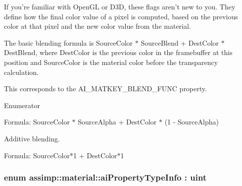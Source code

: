 If you're familiar with Open\+G\+L or D3\+D, these flags aren't new to you. They define how the final color value of a pixel is computed, based on the previous color at that pixel and the new color value from the material.

The basic blending formula is {\ttfamily Source\+Color $\ast$ Source\+Blend + Dest\+Color $\ast$ Dest\+Blend}, where {\ttfamily Dest\+Color} is the previous color in the framebuffer at this position and {\ttfamily Source\+Color} is the material color before the transparency calculation.

This corresponds to the {\ttfamily A\+I\+\_\+\+M\+A\+T\+K\+E\+Y\+\_\+\+B\+L\+E\+N\+D\+\_\+\+F\+U\+N\+C} property. \begin{Desc}
\item[Enumerator]\par
\begin{description}
\item[{\em 
\hypertarget{namespaceassimp_1_1material_a9f8c96d3f766b60d6a002a839366b1eba3f08be388721c4fd720fb6338e6fb1dd}{Default}\label{namespaceassimp_1_1material_a9f8c96d3f766b60d6a002a839366b1eba3f08be388721c4fd720fb6338e6fb1dd}
}]Formula\+: {\ttfamily Source\+Color $\ast$ Source\+Alpha + Dest\+Color $\ast$ (1 -\/ Source\+Alpha)} \item[{\em 
\hypertarget{namespaceassimp_1_1material_a9f8c96d3f766b60d6a002a839366b1eba33fafdf0c752b0c1ac11ff8cf2d216e7}{Additive}\label{namespaceassimp_1_1material_a9f8c96d3f766b60d6a002a839366b1eba33fafdf0c752b0c1ac11ff8cf2d216e7}
}]Additive blending.

Formula\+: {\ttfamily Source\+Color$\ast$1 + Dest\+Color$\ast$1} \end{description}
\end{Desc}
\hypertarget{namespaceassimp_1_1material_a9c77cffdda8a7bb8e6f97ff5e490702a}{
\subsubsection[{ai\+Property\+Type\+Info}]{\setlength{\rightskip}{0pt plus 5cm}enum {\bf assimp\+::material\+::ai\+Property\+Type\+Info} \+: uint}}\label{namespaceassimp_1_1material_a9c77cffdda8a7bb8e6f97ff5e490702a}
